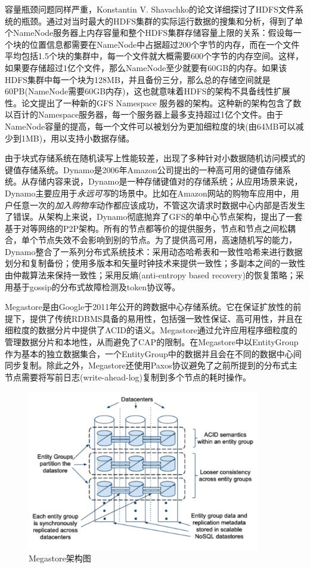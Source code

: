 容量瓶颈问题同样严重，Konstantin V. Shavachko的论文\cite{shvachko2011apache}详细探讨了HDFS文件系统的瓶颈。通过对当时最大的HDFS集群的实际运行数据的搜集和分析，得到了单个NameNode服务器上内存容量和整个HDFS集群存储容量上限的关系：假设每一个块的位置信息都需要在NameNode中占据超过200个字节的内存，而在一个文件平均包括1.5个块的集群中，每一个文件就大概需要600个字节的内存空间。这样，如果要存储超过1亿个文件，那么NameNode至少就要有60GB的内存。如果该HDFS集群中每一个块为128MB，并且备份三分，那么总的存储空间就是60PB(NameNode需要60GB内存)，这也就意味着HDFS的架构不具备线性扩展性。论文\cite{mckusick2009gfs}提出了一种新的GFS Namespace 服务器的架构。这种新的架构包含了数以百计的Namespace服务器，每一个服务器上最多支持超过1亿个文件。由于NameNode容量的提高，每一个文件可以被划分为更加细粒度的块(由64MB可以减少到1MB)，用以支持小数据存储。

由于块式存储系统在随机读写上性能较差，出现了多种针对小数据随机访问模式的键值存储系统。Dynamo\cite{decandia2007dynamo}是2006年Amazon公司提出的一种高可用的键值存储系统。从存储内容来说，Dynamo是一种存储键值对的存储系统；从应用场景来说，Dynamo主要应用于\textit{永远可写}的场景中。比如在Amazon网站的购物车应用中，用户任意一次的\textit{加入购物车}动作都应该成功，不管这次请求时数据中心内部是否发生了错误。从架构上来说，Dynamo彻底抛弃了GFS的单中心节点架构，提出了一套基于对等网络的P2P架构。所有的节点都等价的提供服务，节点和节点之间松耦合，单个节点失效不会影响到别的节点。为了提供高可用，高速随机写的能力，Dynamo整合了一系列分布式系统技术：采用动态哈希表和一致性哈希来进行数据划分和复制备份；使用多版本和矢量时钟技术来提供一致性；多副本之间的一致性由仲裁算法来保持一致性；采用反熵(anti-entropy based recovery)的恢复策略；采用基于gossip的分布式故障检测及token协议等。

Megastore\cite{baker2011megastore}是由Google于2011年公开的跨数据中心存储系统。它在保证扩放性的前提下，提供了传统RDBMS具备的易用性，包括强一致性保证、高可用性，并且在细粒度的数据分片中提供了ACID的语义。Megastore通过允许应用程序细粒度的管理数据分片和本地性，从而避免了CAP\cite{gilbert2002brewer}的限制。在Megastore中以EntityGroup作为基本的独立数据集合，一个EntityGroup中的数据并且会在不同的数据中心间同步复制。除此之外，Megastore还使用Paxos\cite{lamport2001paxos}协议避免了之前所提到的分布式主节点需要将写前日志(write-ahead-log)复制到多个节点的耗时操作。

\begin{figure}[h!]
\centering
\includegraphics[width=4in]{../figures/megastore.pdf}
\caption{Megastore架构图}
\label{fig:megastore}
\end{figure}

